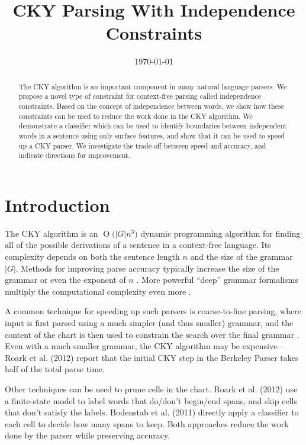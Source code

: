 \documentclass[11pt]{article}
\date{\today}
\title{CKY Parsing With Independence Constraints}
\newcommand{\BigO}[1]{\ensuremath{\operatorname{O}\bigl(#1\bigr)}}
\begin{document}
\maketitle

\begin{abstract}
The CKY algorithm is an important component in many natural language
parsers. We propose a novel type of constraint for context-free
parsing called independence constraints. Based on the concept
of independence between words, we show how these constraints can be
used to reduce the work done in the CKY algorithm. We demonstrate a
classifier which can be used to identify boundaries between
independent words in a sentence using only surface features, and show
that it can be used to speed up a CKY parser. We investigate the
trade-off between speed and accuracy, and indicate directions for
improvement.
\end{abstract}

\section{Introduction}
\label{sec-1}



The CKY algorithm is an \BigO{|G|n^3} dynamic programming
algorithm for finding all of the possible derivations of a sentence in
a context-free language. Its complexity depends on both the sentence
length $n$ and the size of the grammar $|G|$. Methods for improving
parse accuracy typically increase the size of the grammar 
\cite{Klein2003,Petrov2007} or even the exponent of $n$ \cite{Eisner1999}. 
More powerful “deep” grammar formalisms multiply the computational
complexity even more \cite{Bangalore1999}.

A common technique for speeding up such parsers is coarse-to-fine
parsing, where input is first parsed using a much simpler (and thus
smaller) grammar, and the content of the chart is then used to
constrain the search over the final grammar
\cite{Torisawa2000,Charniak2005,Petrov2007}. Even with a much smaller
grammar, the CKY algorithm may be expensive---Roark et al. (2012)
report that the initial CKY step in the Berkeley Parser takes half of
the total parse time.

Other techniques can be used to prune cells in the chart. Roark et al.
(2012) use a finite-state model to label words that do/don't begin/end
spans, and skip cells that don't satisfy the labels. Bodenstab et al.
(2011) directly apply a classifier to each cell to decide how many
spans to keep. Both approaches reduce the work done by the parser
while preserving accuracy.
\end{document}
